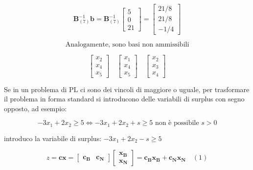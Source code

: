 \documentclass[a4paper, 11pt]{article}
\begin{document}
    
                \[
                    \mathbf{B}_{(7)}^{-1} \mathbf{b} = \mathbf{B}_{(7)}^{-1} \begin{bmatrix} 5 \\ 0 \\ 21 \end{bmatrix} = \begin{bmatrix} 21/8 \\ 21/8 \\ -1/4 \end{bmatrix}
                \]
    

                \[
                    \text{Analogamente, sono basi non ammissibili}
                \]    
    

                \[
                    \begin{bmatrix} x_2 \\ x_4 \\ x_5 \end{bmatrix} \quad \begin{bmatrix} x_1 \\ x_4 \\ x_5 \end{bmatrix} \quad \begin{bmatrix} x_2 \\ x_3 \\ x_4 \end{bmatrix}
                \]

                Se in un problema di PL ci sono dei vincoli di maggiore o uguale, per trasformare il problema in forma standard si introducono delle variabili di surplus con segno opposto, ad esempio:

                \[
                    -3x_1+2x_2 \geq 5 \Leftrightarrow -3x_1+2x_2 + s \geq 5 \text{ non è possibile $s > 0 $}
                \]

                introduco la variabile di surplus: $-3x_1+2x_2 - s \geq 5$


                \[
                z = \mathbf{cx} = \begin{bmatrix} \mathbf{c_B} & \mathbf{c_N} \end{bmatrix} 
                \begin{bmatrix} \mathbf{x_B} \\ \mathbf{x_N} \end{bmatrix} = 
                \mathbf{c_B x_B} + \mathbf{c_N x_N} \quad (1)
                \]
                
\end{document}
